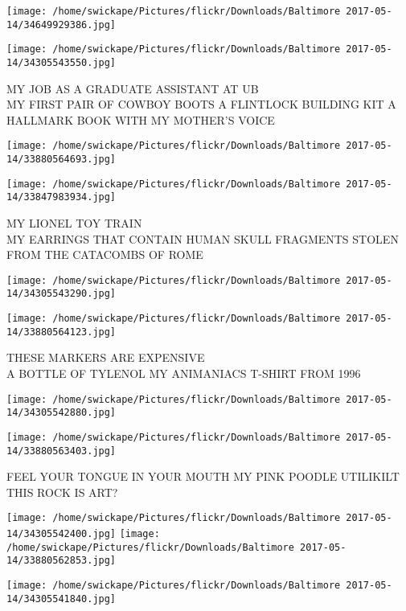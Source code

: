 \documentclass[10pt,letterpaper]{article}
\begin{document}
\texttt{[image: /home/swickape/Pictures/flickr/Downloads/Baltimore 2017-05-14/34649929386.jpg]}

\vspace{0.25in}
\texttt{[image: /home/swickape/Pictures/flickr/Downloads/Baltimore 2017-05-14/34305543550.jpg]}

MY JOB AS A GRADUATE ASSISTANT AT UB\\
MY FIRST PAIR OF COWBOY BOOTS A FLINTLOCK BUILDING KIT A HALLMARK BOOK WITH MY MOTHER'S VOICE
\pagebreak

\texttt{[image: /home/swickape/Pictures/flickr/Downloads/Baltimore 2017-05-14/33880564693.jpg]}

\vspace{0.25in}
\texttt{[image: /home/swickape/Pictures/flickr/Downloads/Baltimore 2017-05-14/33847983934.jpg]}

MY LIONEL TOY TRAIN\\
MY EARRINGS THAT CONTAIN HUMAN SKULL FRAGMENTS STOLEN FROM THE CATACOMBS OF ROME
\pagebreak

\texttt{[image: /home/swickape/Pictures/flickr/Downloads/Baltimore 2017-05-14/34305543290.jpg]}

\vspace{0.25in}
\texttt{[image: /home/swickape/Pictures/flickr/Downloads/Baltimore 2017-05-14/33880564123.jpg]}

THESE MARKERS ARE EXPENSIVE\\
A BOTTLE OF TYLENOL MY ANIMANIACS T{-}SHIRT FROM 1996
\pagebreak

\texttt{[image: /home/swickape/Pictures/flickr/Downloads/Baltimore 2017-05-14/34305542880.jpg]}

\vspace{0.25in}
\texttt{[image: /home/swickape/Pictures/flickr/Downloads/Baltimore 2017-05-14/33880563403.jpg]}

FEEL YOUR TONGUE IN YOUR MOUTH MY PINK POODLE UTILIKILT\\
THIS ROCK IS ART?
\pagebreak

\texttt{[image: /home/swickape/Pictures/flickr/Downloads/Baltimore 2017-05-14/34305542400.jpg]}
\texttt{[image: /home/swickape/Pictures/flickr/Downloads/Baltimore 2017-05-14/33880562853.jpg]}

\vspace{0.25in}
\texttt{[image: /home/swickape/Pictures/flickr/Downloads/Baltimore 2017-05-14/34305541840.jpg]}
\end{document}
